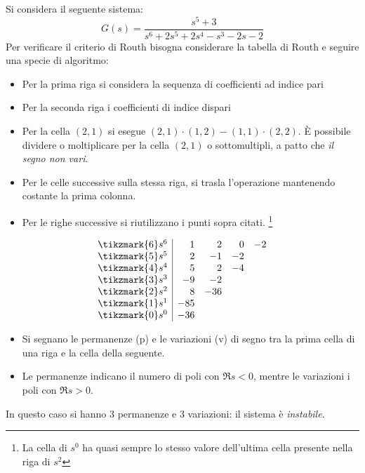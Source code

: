 \begin{esempio}
Si considera il seguente sistema:
\[
	G(s) = \frac{s^5 + 3}{s^6 + 2s^5 + 2s^4 - s^3 - 2s - 2}
\]
Per verificare il criterio di Routh bisogna considerare la tabella di Routh e
seguire una specie di algoritmo:
\begin{itemize}
	\item Per la prima riga si considera la sequenza di coefficienti ad indice pari
	\item Per la seconda riga i coefficienti di indice dispari
	\item Per la cella \((2,1)\) si esegue \((2,1)\cdot(1,2) - (1,1)\cdot(2,2)\).
		È possibile dividere o moltiplicare per la cella \((2,1)\) o
		sottomultipli, a patto che \emph{il segno non vari}.
	\item Per le celle successive sulla stessa riga, si trasla l'operazione
		mantenendo costante la prima colonna.
	\item Per le righe successive si riutilizzano i punti sopra citati.%
		\footnote{La cella di \(s^0\) ha quasi sempre lo stesso valore
			dell'ultima cella presente nella riga di \(s^2\)}
\end{itemize}
\[\begin{array}{r|rrrr}
	\tikzmark{6}s^6 &   1 &   2 &  0 & -2	\\
	\tikzmark{5}s^5 &   2 & - 1 & -2 	\\
	\tikzmark{4}s^4 &   5 &   2 & -4 	\\
	\tikzmark{3}s^3 & - 9 & - 2		\\
	\tikzmark{2}s^2 &   8 & -36		\\
	\tikzmark{1}s^1 & -85			\\
	\tikzmark{0}s^0 & -36
\end{array}\]
\begin{itemize}
	\item Si segnano le permanenze (p) e le variazioni (v) di segno tra la prima cella
		di una riga e la cella della seguente.
	\item Le permanenze indicano il numero di poli con \(\Re s < 0\), mentre
		le variazioni i poli con \(\Re s > 0\).
\end{itemize}
In questo caso si hanno 3 permanenze e 3 variazioni: il sistema è \emph{instabile}.
\end{esempio}
